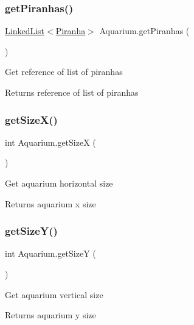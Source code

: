 \subsubsection{\texorpdfstring{get\+Piranhas()}{getPiranhas()}}
{\footnotesize\ttfamily \mbox{\hyperlink{class_linked_list}{Linked\+List}}$<$\mbox{\hyperlink{class_piranha}{Piranha}}$>$ Aquarium.\+get\+Piranhas (\begin{DoxyParamCaption}{ }\end{DoxyParamCaption})\hspace{0.3cm}{\ttfamily [inline]}}

Get reference of list of piranhas \begin{DoxyReturn}{Returns}
reference of list of piranhas 
\end{DoxyReturn}
\mbox{\label{class_aquarium_ac2e5c1499608a5d7c2f47a7ba4dee132}} 
\subsubsection{\texorpdfstring{get\+Size\+X()}{getSizeX()}}
{\footnotesize\ttfamily int Aquarium.\+get\+SizeX (\begin{DoxyParamCaption}{ }\end{DoxyParamCaption})\hspace{0.3cm}{\ttfamily [inline]}}

Get aquarium horizontal size \begin{DoxyReturn}{Returns}
aquarium x size 
\end{DoxyReturn}
\mbox{\label{class_aquarium_ae7c79ab9763151e19723de5f29e64028}} 
\subsubsection{\texorpdfstring{get\+Size\+Y()}{getSizeY()}}
{\footnotesize\ttfamily int Aquarium.\+get\+SizeY (\begin{DoxyParamCaption}{ }\end{DoxyParamCaption})\hspace{0.3cm}{\ttfamily [inline]}}

Get aquarium vertical size \begin{DoxyReturn}{Returns}
aquarium y size 
\end{DoxyReturn}
\mbox{\label{class_aquarium_ad892096807da645e15351c8df29d75de}} 
